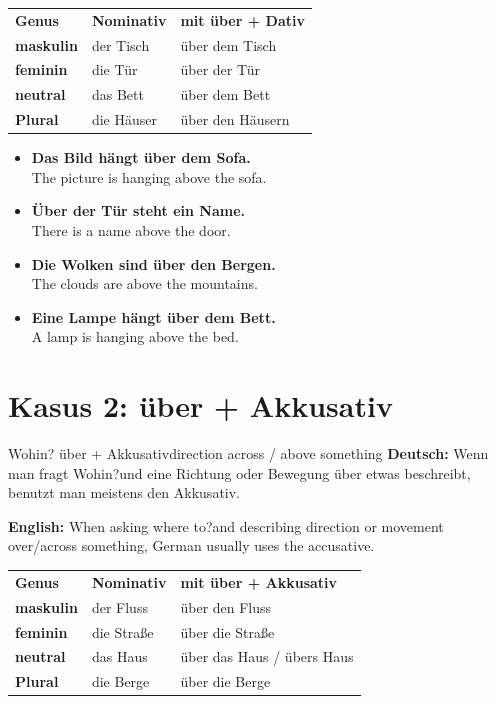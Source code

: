\documentclass[a4paper,11pt]{article}
\newcommand{\GermanText}[1]{\textbf{Deutsch: }#1\par}
\newcommand{\EnglishText}[1]{{\small\color{SoftGray}\textbf{English: }#1\par}}
\newcommand{\ExampleItem}[2]{\item \textbf{#1}\\{\small\color{SoftGray}#2}}
\begin{document}
\begin{tabularx}{\textwidth}{>{\bfseries}p{}X X}
\rowcolor{HeaderBlueDark}
\color{white}\textbf{Genus} & \color{white}\textbf{Nominativ} & \color{white}\textbf{mit über + Dativ} \\
maskulin & der Tisch & über dem Tisch \\
feminin & die Tür & über der Tür \\
neutral & das Bett & über dem Bett \\
Plural & die Häuser & über den Häusern \\
\end{tabularx}

\begin{exbox}
\begin{itemize}
    \ExampleItem{Das Bild hängt über dem Sofa.}{The picture is hanging above the sofa.}
    \ExampleItem{Über der Tür steht ein Name.}{There is a name above the door.}
    \ExampleItem{Die Wolken sind über den Bergen.}{The clouds are above the mountains.}
    \ExampleItem{Eine Lampe hängt über dem Bett.}{A lamp is hanging above the bed.}
\end{itemize}
\end{exbox}

\section{Kasus 2: über + Akkusativ}

\begin{grammarentry}{Wohin? über + Akkusativ}{direction across / above something}
\GermanText{Wenn man fragt \glqq Wohin?\grqq und eine Richtung oder Bewegung über etwas beschreibt, benutzt man meistens den Akkusativ.}
\EnglishText{When asking \glqq where to?\grqq and describing direction or movement over/across something, German usually uses the accusative.}
\end{grammarentry}

\begin{tabularx}{\textwidth}{>{\bfseries}p{}X X}
\rowcolor{HeaderBlueDark}
\color{white}\textbf{Genus} & \color{white}\textbf{Nominativ} & \color{white}\textbf{mit über + Akkusativ} \\
maskulin & der Fluss & über den Fluss \\
feminin & die Straße & über die Straße \\
neutral & das Haus & über das Haus / übers Haus \\
Plural & die Berge & über die Berge \\
\end{tabularx}
\end{document}
